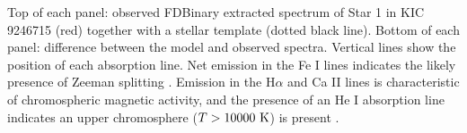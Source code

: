 \label{fig:emission1} Top of each panel: observed FDBinary extracted spectrum of Star 1 in KIC 9246715 (red) together with a stellar template (dotted black line). Bottom of each panel: difference between the model and observed spectra. Vertical lines show the position of each absorption line. Net emission in the Fe I lines indicates the likely presence of Zeeman splitting \citep{har73}. Emission in the H$\alpha$ and Ca II lines is characteristic of chromospheric magnetic activity, and the presence of an He I absorption line indicates an upper chromosphere ($T > 10000 \ \rm{K}$) is present \citep{fro12}.
  
  